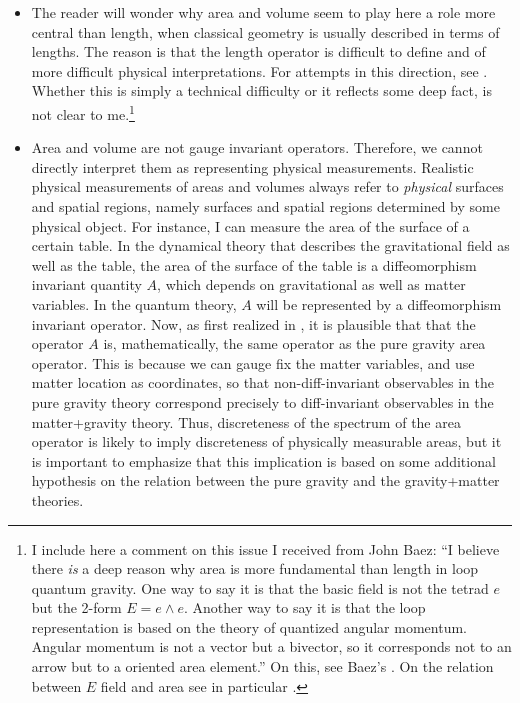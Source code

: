 \begin{itemize}
\begin{itemize}
\item The reader will wonder why area and volume seem to play here a 
role more central than length, when classical geometry is usually 
described in terms of lengths.  The reason is that the length operator 
is difficult to define and of more difficult physical interpretations.  
For attempts in this direction, see \cite{ThiemannLength}.  Whether 
this is simply a technical difficulty or it reflects some deep fact, 
is not clear to me.\footnote{I include here a comment on this issue 
I received from John Baez: ``I believe there {\em is\/} a deep reason
why area is more fundamental than length in loop quantum gravity.  One
way to say it is that the basic field is not the tetrad $e$ but the
2-form $E = e\wedge e$.  Another way to say it is that the loop
representation is based on the theory of quantized angular momentum.
Angular momentum is not a vector but a bivector, so it corresponds not
to an arrow but to a oriented area element.''  On this, see 
Baez's \cite{Baez97}.  On the relation between $E$ field and area see in 
particular \cite{Rovelli93b}.}

	\item Area and volume are not gauge invariant operators.  
	Therefore, we cannot directly interpret them as representing 
	physical measurements.  Realistic physical measurements of 
	areas and volumes always refer to {\em physical\/} surfaces 
	and spatial regions, namely surfaces and spatial regions 
	determined by some physical object.  For instance, I can 
	measure the area of the surface of a certain table.  In the 
	dynamical theory that describes the gravitational field as 
	well as the table, the area of the surface of the table is a 
	diffeomorphism invariant quantity $A$, which depends on 
	gravitational as well as matter variables.  In the quantum 
	theory, $A$ will be represented by a diffeomorphism invariant 
	operator.  Now, as first realized in \cite{RovelliArea}, it 
	is plausible that that the operator $A$ is, mathematically, 
	the same operator as the pure gravity area operator.  This is 
	because we can gauge fix the matter variables, and use matter 
	location as coordinates, so that non-diff-invariant 
	observables in the pure gravity theory correspond precisely 
	to diff-invariant observables in the matter+gravity theory.  
	Thus, discreteness of the spectrum of the area operator is 
	likely to imply discreteness of physically measurable areas, 
	but it is important to emphasize that this implication is 
	based on some additional hypothesis on the relation between 
	the pure gravity and the gravity+matter theories.


\end{itemize}
\end{itemize}

